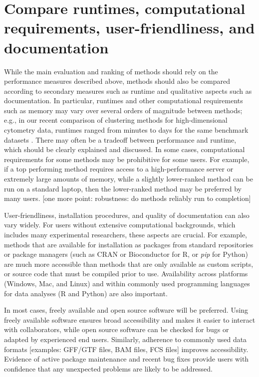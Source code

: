 \documentclass[12pt, a4paper]{article}
\begin{document}
\section{Compare runtimes, computational requirements, user-friendliness, and documentation}

While the main evaluation and ranking of methods should rely on the performance measures described above, methods should also be compared according to secondary measures such as runtime and qualitative aspects such as documentation. In particular, runtimes and other computational requirements such as memory may vary over several orders of magnitude between methods; e.g., in our recent comparison of clustering methods for high-dimensional cytometry data, runtimes ranged from minutes to days for the same benchmark datasets \citep{Weber2016}. There may often be a tradeoff between performance and runtime, which should be clearly explained and discussed. In some cases, computational requirements for some methods may be prohibitive for some users. For example, if a top performing method requires access to a high-performance server or extremely large amounts of memory, while a slightly lower-ranked method can be run on a standard laptop, then the lower-ranked method may be preferred by many users. [one more point: robustness: do methods reliably run to completion]

User-friendliness, installation procedures, and quality of documentation can also vary widely. For users without extensive computational backgrounds, which includes many experimental researchers, these aspects are crucial. For example, methods that are available for installation as packages from standard repositories or package managers (such as CRAN or Bioconductor for R, or \textit{pip} for Python) are much more accessible than methods that are only available as custom scripts, or source code that must be compiled prior to use. Availability across platforms (Windows, Mac, and Linux) and within commonly used programming languages for data analyses (R and Python) are also important.

In most cases, freely available and open source software will be preferred. Using freely available software ensures broad accessibility and makes it easier to interact with collaborators, while open source software can be checked for bugs or adapted by experienced end users. Similarly, adherence to commonly used data formats [examples: GFF/GTF files, BAM files, FCS files] improves accessibility. Evidence of active package maintenance and recent bug fixes provide users with confidence that any unexpected problems are likely to be addressed.
\end{document}
